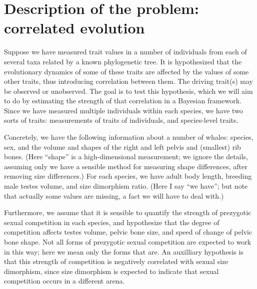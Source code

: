 \documentclass{article}
\begin{document}
\section{Description of the problem: correlated evolution}

Suppose we have measured trait values in a number of individuals from each of several taxa related by a known phylogenetic tree.
It is hypothesized that the evolutionary dynamics of some of these traits
are affected by the values of some other traits,
thus introducing correlation between them.
The driving trait(s) may be observed or unobserved.
The goal is to test this hypothesis,
which we will aim to do by estimating the strength of that correlation
in a Bayesian framework.
Since we have measured multiple individuals within each species,
we have two sorts of traits:
measurements of traits of individuals, 
and species-level traits.

Concretely, we have the following information about a number of whales:
species, sex,
and the volume and shapes of the right and left pelvis and (smallest) rib bones.
(Here ``shape'' is a high-dimensional measurement;
we ignore the details, assuming only we have a sensible method for measuring shape differences,
after removing size differences.)
For each species, we have
adult body length,
breeding male testes volume,
and size dimorphism ratio.
(Here I say ``we have''; but note that actually some values are missing,
a fact we will have to deal with.)

Furthermore, we assume that it is sensible to quantify the strength of prezygotic sexual competition in each species,
and hypothesize that the degree of competition affects testes volume, pelvic bone size, and speed of change of pelvic bone shape.
Not all forms of prezygotic sexual competition are expected to work in this way;
here we mean only the forms that are.
An auxilliary hypothesis is that this strength of competition is negatively correlated with sexual size dimorphism,
since size dimorphism is expected to indicate that sexual competition occurs in a different arena.
\end{document}
